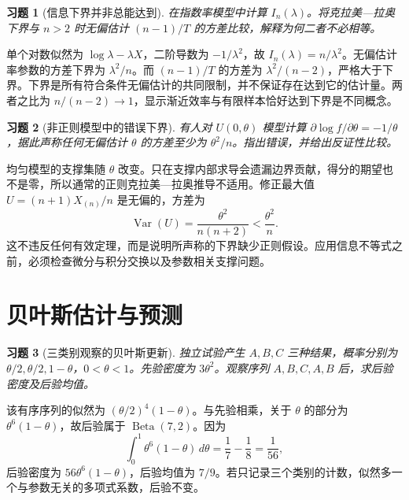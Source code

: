 \documentclass[UTF8,12pt,a4paper,fontset=fandol]{ctexart}
\newtheorem{exercise}{习题}[section]
\begin{document}
\begin{exercise}[信息下界并非总能达到]\label{q:B11.7}
在指数率模型中计算 $I_n(\lambda)$。将克拉美—拉奥下界与 $n>2$ 时无偏估计 $(n-1)/T$ 的方差比较，解释为何二者不必相等。\par{}
\end{exercise}

\begin{solve}\label{a:B11.7}单个对数似然为 $\log\lambda-\lambda X$，二阶导数为 $-1/\lambda^2$，故 $I_n(\lambda)=n/\lambda^2$。无偏估计率参数的方差下界为 $\lambda^2/n$。而 $(n-1)/T$ 的方差为 $\lambda^2/(n-2)$，严格大于下界。下界是所有符合条件无偏估计的共同限制，并不保证存在达到它的估计量。两者之比为 $n/(n-2)\to1$，显示渐近效率与有限样本恰好达到下界是不同概念。\end{solve}

\begin{exercise}[非正则模型中的错误下界]\label{q:B11.8}
有人对 $U(0,\theta)$ 模型计算 $\partial\log f/\partial\theta=-1/\theta$，据此声称任何无偏估计 $\theta$ 的方差至少为 $\theta^2/n$。指出错误，并给出反证性比较。\par{}
\end{exercise}

\begin{solve}\label{a:B11.8}均匀模型的支撑集随 $\theta$ 改变。只在支撑内部求导会遗漏边界贡献，得分的期望也不是零，所以通常的正则克拉美—拉奥推导不适用。修正最大值 $U=(n+1)X_{(n)}/n$ 是无偏的，方差为\[\operatorname{Var}(U)=\frac{\theta^2}{n(n+2)}<\frac{\theta^2}{n}.\]这不违反任何有效定理，而是说明所声称的下界缺少正则假设。应用信息不等式之前，必须检查微分与积分交换以及参数相关支撑问题。\end{solve}

\clearpage\section{贝叶斯估计与预测}

\begin{exercise}[三类别观察的贝叶斯更新]\label{q:M-E2-II2}
独立试验产生 $A,B,C$ 三种结果，概率分别为 $\theta/2,\theta/2,1-\theta$，$0<\theta<1$。先验密度为 $3\theta^2$。观察序列 $A,B,C,A,B$ 后，求后验密度及后验均值。\par{}
\end{exercise}

\begin{solve}\label{a:M-E2-II2}该有序序列的似然为 $(\theta/2)^4(1-\theta)$。与先验相乘，关于 $\theta$ 的部分为 $\theta^6(1-\theta)$，故后验属于 $\operatorname{Beta}(7,2)$。因为\[\int_0^1\theta^6(1-\theta)\,d\theta=\frac17-\frac18=\frac1{56},\]后验密度为 $56\theta^6(1-\theta)$，后验均值为 $7/9$。若只记录三个类别的计数，似然多一个与参数无关的多项式系数，后验不变。\end{solve}
\end{document}

